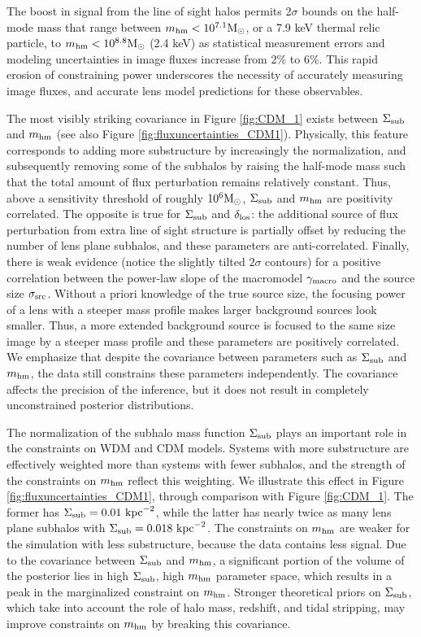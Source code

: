 The boost in signal from the line of sight halos permits 2$\sigma$ bounds on the half-mode mass that range between ${m_{\rm{hm}}} < 10^{7.1} {\rm{M}_{\odot}}$, or a 7.9 keV thermal relic particle, to ${m_{\rm{hm}}} < 10^{8.8} {\rm{M}_{\odot}}$ (2.4 keV) as statistical measurement errors and modeling uncertainties in image fluxes increase from $2 \%$ to $6\%$. This rapid erosion of constraining power underscores the necessity of accurately measuring image fluxes, and accurate lens model predictions for these observables. 

The most visibly striking covariance in Figure \ref{fig:CDM_1} exists between $\Sigma_{\rm{sub}}$ and ${m_{\rm{hm}}}$ (see also Figure \ref{fig:fluxuncertainties_CDM1}). Physically, this feature corresponds to adding more substructure by increasingly the normalization, and subsequently removing some of the subhalos by raising the half-mode mass such that the total amount of flux perturbation remains relatively constant. Thus, above a sensitivity threshold of roughly $10^{6} {\rm{M}_{\odot}}$, $\Sigma_{\rm{sub}}$ and ${m_{\rm{hm}}}$ are positivity correlated. The opposite is true for $\Sigma_{\rm{sub}}$ and $\delta_{\rm{los}}$: the additional source of flux perturbation from extra line of sight structure is partially offset by reducing the number of lens plane subhalos, and these parameters are anti-correlated. Finally, there is weak evidence (notice the slightly tilted $2\sigma$ contours) for a positive correlation between the power-law slope of the macromodel $\gamma_{\rm{macro}}$ and the source size $\sigma_{\rm{src}}$. Without a priori knowledge of the true source size, the focusing power of a lens with a steeper mass profile makes larger background sources look smaller. Thus, a more extended background source is focused to the same size image by a steeper mass profile and these parameters are positively correlated. We emphasize that despite the covariance between parameters such as $\Sigma_{\rm{sub}}$ and ${m_{\rm{hm}}}$, the data still constrains these parameters independently. The covariance affects the precision of the inference, but it does not result in completely unconstrained posterior distributions.  

The normalization of the subhalo mass function $\Sigma_{\rm{sub}}$ plays an important role in the constraints on WDM and CDM models. Systems with more substructure are effectively weighted more than systems with fewer subhalos, and the strength of the constraints on ${m_{\rm{hm}}}$ reflect this weighting. We illustrate this effect in Figure \ref{fig:fluxuncertainties_CDM1}, through comparison with Figure \ref{fig:CDM_1}. The former has $\Sigma_{\rm{sub}} = 0.01 \ \rm{kpc}^{-2}$, while the latter has nearly twice as many lens plane subhalos with $\Sigma_{\rm{sub}} = 0.018 \ \rm{kpc}^{-2}$. The constraints on ${m_{\rm{hm}}}$ are weaker for the simulation with less substructure, because the data contains less signal. Due to the covariance between $\Sigma_{\rm{sub}}$ and ${m_{\rm{hm}}}$, a significant portion of the volume of the posterior lies in high $\Sigma_{\rm{sub}}$, high ${m_{\rm{hm}}}$ parameter space, which results in a peak in the marginalized constraint on ${m_{\rm{hm}}}$. Stronger theoretical priors on $\Sigma_{\rm{sub}}$, which take into account the role of halo mass, redshift, and tidal stripping, may improve constraints on ${m_{\rm{hm}}}$ by breaking this covariance.

